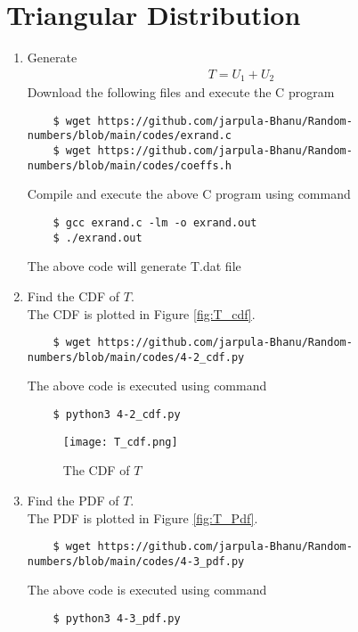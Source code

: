 \documentclass[journal,12pt,twocolumn]{IEEEtran}
\renewcommand\thesection{\arabic{section}}
\begin{document}
\section{Triangular Distribution}
\begin{enumerate}[label=\thesection.\arabic*
,ref=\thesection.\theenumi]
%
\item Generate 
	\begin{align}
		T = U_1+U_2
	\end{align}
    \solution
    Download the following files and execute the C program
    \begin{lstlisting}
    $ wget https://github.com/jarpula-Bhanu/Random-numbers/blob/main/codes/exrand.c
    $ wget https://github.com/jarpula-Bhanu/Random-numbers/blob/main/codes/coeffs.h
    \end{lstlisting}
    Compile and execute the above C program using command
    \begin{lstlisting}
    $ gcc exrand.c -lm -o exrand.out
    $ ./exrand.out
    \end{lstlisting}
The above code will generate T.dat file\\
\item Find the CDF of $T$.\\
\solution The CDF is plotted in Figure \eqref{fig:T_cdf}.

\begin{lstlisting}
    $ wget https://github.com/jarpula-Bhanu/Random-numbers/blob/main/codes/4-2_cdf.py
\end{lstlisting}
The above code is executed using command
\begin{lstlisting}
    $ python3 4-2_cdf.py
\end{lstlisting}

\begin{figure}[h]
    \centering
    \texttt{[image: T\_cdf.png]}
    \caption{The CDF of $T$}
    \label{fig:T_cdf}
\end{figure}
\item Find the PDF of $T$.\\
\solution The PDF is plotted in Figure \eqref{fig:T_Pdf}.

\begin{lstlisting}
    $ wget https://github.com/jarpula-Bhanu/Random-numbers/blob/main/codes/4-3_pdf.py
\end{lstlisting}
The above code is executed using command
\begin{lstlisting}
    $ python3 4-3_pdf.py
\end{lstlisting}


\end{enumerate}
\end{document}
